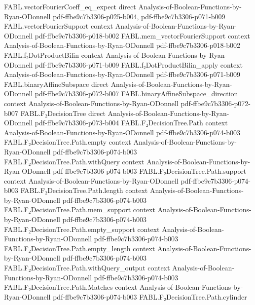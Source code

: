 \begin{theorem}
\proofstep
  {FABL.vectorFourierCoeff_eq_expect}
  {direct}
  {Analysis-of-Boolean-Functions-by-Ryan-ODonnell}
  {pdf-ffbe9c7b3306-p025-b004,
    pdf-ffbe9c7b3306-p071-b009}
\proofstep
  {FABL.vectorFourierSupport}
  {context}
  {Analysis-of-Boolean-Functions-by-Ryan-ODonnell}
  {pdf-ffbe9c7b3306-p018-b002}
\proofstep
  {FABL.mem_vectorFourierSupport}
  {context}
  {Analysis-of-Boolean-Functions-by-Ryan-ODonnell}
  {pdf-ffbe9c7b3306-p018-b002}
\proofstep
  {FABL.f₂DotProductBilin}
  {context}
  {Analysis-of-Boolean-Functions-by-Ryan-ODonnell}
  {pdf-ffbe9c7b3306-p071-b009}
\proofstep
  {FABL.f₂DotProductBilin_apply}
  {context}
  {Analysis-of-Boolean-Functions-by-Ryan-ODonnell}
  {pdf-ffbe9c7b3306-p071-b009}
\proofstep
  {FABL.binaryAffineSubspace}
  {direct}
  {Analysis-of-Boolean-Functions-by-Ryan-ODonnell}
  {pdf-ffbe9c7b3306-p072-b007}
\proofstep
  {FABL.binaryAffineSubspace_direction}
  {context}
  {Analysis-of-Boolean-Functions-by-Ryan-ODonnell}
  {pdf-ffbe9c7b3306-p072-b007}
\proofstep
  {FABL.F₂DecisionTree}
  {direct}
  {Analysis-of-Boolean-Functions-by-Ryan-ODonnell}
  {pdf-ffbe9c7b3306-p073-b004}
\proofstep
  {FABL.F₂DecisionTree.Path}
  {context}
  {Analysis-of-Boolean-Functions-by-Ryan-ODonnell}
  {pdf-ffbe9c7b3306-p074-b003}
\proofstep
  {FABL.F₂DecisionTree.Path.empty}
  {context}
  {Analysis-of-Boolean-Functions-by-Ryan-ODonnell}
  {pdf-ffbe9c7b3306-p074-b003}
\proofstep
  {FABL.F₂DecisionTree.Path.withQuery}
  {context}
  {Analysis-of-Boolean-Functions-by-Ryan-ODonnell}
  {pdf-ffbe9c7b3306-p074-b003}
\proofstep
  {FABL.F₂DecisionTree.Path.support}
  {context}
  {Analysis-of-Boolean-Functions-by-Ryan-ODonnell}
  {pdf-ffbe9c7b3306-p074-b003}
\proofstep
  {FABL.F₂DecisionTree.Path.length}
  {context}
  {Analysis-of-Boolean-Functions-by-Ryan-ODonnell}
  {pdf-ffbe9c7b3306-p074-b003}
\proofstep
  {FABL.F₂DecisionTree.Path.mem_support}
  {context}
  {Analysis-of-Boolean-Functions-by-Ryan-ODonnell}
  {pdf-ffbe9c7b3306-p074-b003}
\proofstep
  {FABL.F₂DecisionTree.Path.empty_support}
  {context}
  {Analysis-of-Boolean-Functions-by-Ryan-ODonnell}
  {pdf-ffbe9c7b3306-p074-b003}
\proofstep
  {FABL.F₂DecisionTree.Path.empty_length}
  {context}
  {Analysis-of-Boolean-Functions-by-Ryan-ODonnell}
  {pdf-ffbe9c7b3306-p074-b003}
\proofstep
  {FABL.F₂DecisionTree.Path.withQuery_output}
  {context}
  {Analysis-of-Boolean-Functions-by-Ryan-ODonnell}
  {pdf-ffbe9c7b3306-p074-b003}
\proofstep
  {FABL.F₂DecisionTree.Path.Matches}
  {context}
  {Analysis-of-Boolean-Functions-by-Ryan-ODonnell}
  {pdf-ffbe9c7b3306-p074-b003}
\proofstep
  {FABL.F₂DecisionTree.Path.cylinder}

\end{theorem}
